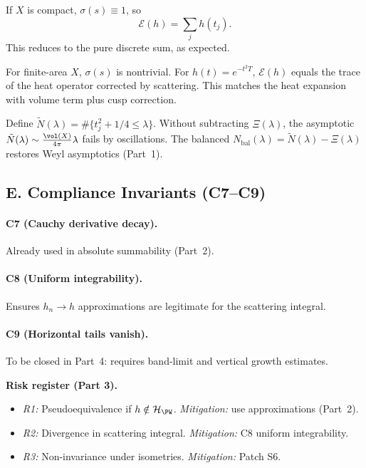 \begin{example}
If $X$ is compact, $\sigma(s)\equiv 1$, so
\[
  \mathcal E(h)=\sum_j h(t_j).
\]
This reduces to the pure discrete sum, as expected.
\end{example}

\begin{example}
For finite-area $X$, $\sigma(s)$ is nontrivial. For $h(t)=e^{-t^2T}$, $\mathcal E(h)$ equals the trace of the heat operator corrected by scattering. This matches the heat expansion with volume term plus cusp correction.
\end{example}

\begin{counterexample}
Define $\tilde N(\lambda)=\#\{t_j^2+1/4\le \lambda\}$. Without subtracting $\Xi(\lambda)$, the asymptotic $\tilde N(\lambda)\sim\frac{\vol(X)}{4\pi}\lambda$ fails by oscillations. The balanced $N_{\mathrm{bal}}(\lambda)=\tilde N(\lambda)-\Xi(\lambda)$ restores Weyl asymptotics (Part~1).
\end{counterexample}


\subsection*{E. Compliance Invariants (C7–C9)}
\label{subsec:invariants-part3}

\paragraph{C7 (Cauchy derivative decay).} Already used in absolute summability (Part~2).
\paragraph{C8 (Uniform integrability).} Ensures $h_n\to h$ approximations are legitimate for the scattering integral.
\paragraph{C9 (Horizontal tails vanish).} To be closed in Part~4: requires band-limit and vertical growth estimates.

\medskip
\noindent\textbf{Risk register (Part 3).}
\begin{itemize}
  \item \emph{R1:} Pseudoequivalence if $h\notin\mathcal H_{\PW}$. \emph{Mitigation:} use approximations (Part~2).
  \item \emph{R2:} Divergence in scattering integral. \emph{Mitigation:} C8 uniform integrability.
  \item \emph{R3:} Non-invariance under isometries. \emph{Mitigation:} Patch S6.
\end{itemize}

